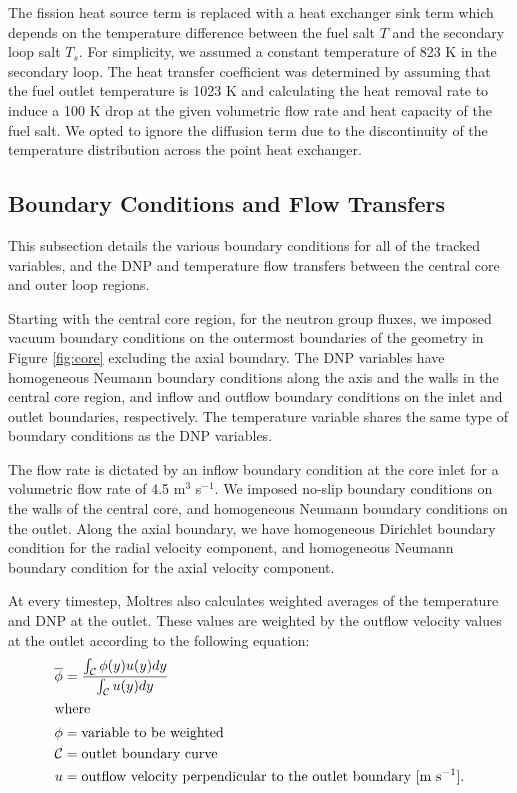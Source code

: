 The fission heat source term is replaced with a heat exchanger sink term
which depends on the temperature difference between the fuel salt $T$ and the
secondary loop salt $T_s$. For simplicity, we assumed a constant temperature
of 823 K in the secondary loop. The heat transfer coefficient was determined
by assuming that the fuel outlet temperature is 1023 K and calculating the
heat removal rate to induce a 100 K drop at the given volumetric flow rate
and heat capacity of the fuel salt. We opted to ignore the diffusion term due
to the discontinuity of the temperature distribution across the point heat
exchanger. 

\subsection{Boundary Conditions and Flow Transfers}

This subsection details the various boundary conditions for all of the
tracked variables, and the \gls{DNP} and temperature flow transfers between
the central core and outer loop regions. 

Starting with the central core region, for the neutron group fluxes, we
imposed vacuum boundary conditions on the
outermost boundaries of the geometry in Figure \ref{fig:core} excluding the
axial boundary. The \gls{DNP} variables have homogeneous Neumann boundary
conditions along the axis and the walls in the central core region, and inflow
and outflow boundary conditions on the inlet and outlet boundaries,
respectively. The temperature variable shares the same type of boundary
conditions as the \gls{DNP} variables.

The flow rate is dictated by an inflow boundary condition at the core inlet
for a volumetric flow rate of 4.5 m$^3$ s$^{-1}$. We imposed no-slip boundary
conditions on the walls of the central core, and homogeneous Neumann boundary
conditions on the outlet. Along the axial boundary, we have homogeneous
Dirichlet boundary condition for the radial velocity component, and
homogeneous Neumann boundary condition for the axial velocity component.

At every timestep, Moltres also calculates weighted averages of the
temperature and \gls{DNP} at the outlet. These values are weighted by the
outflow velocity values at the outlet according to the following equation:
%
\begin{align}
    \overline{\phi} &= \frac{\int_\mathcal{C} \phi(y) u(y) dy}{
    \int_\mathcal{C} u(y) dy} \\
    \intertext{where}
    \phi &= \text{variable to be weighted} \nonumber \\
    \mathcal{C} &= \text{outlet boundary curve} \nonumber \\
    u &= \text{outflow velocity perpendicular to the outlet boundary [m
    s$^{-1}$].} \nonumber
\end{align}

